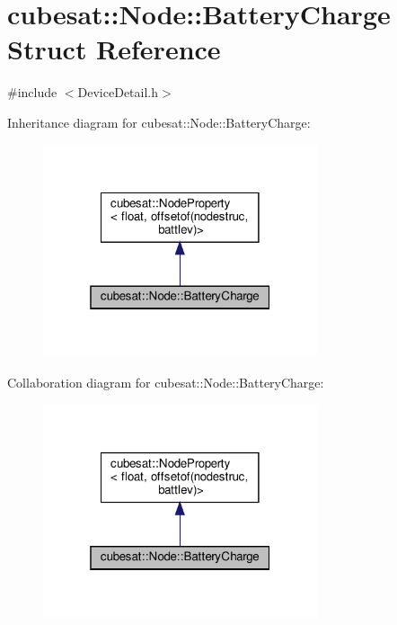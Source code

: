 \hypertarget{structcubesat_1_1Node_1_1BatteryCharge}{}\section{cubesat\+:\+:Node\+:\+:Battery\+Charge Struct Reference}
\label{structcubesat_1_1Node_1_1BatteryCharge}


{\ttfamily \#include $<$Device\+Detail.\+h$>$}



Inheritance diagram for cubesat\+:\+:Node\+:\+:Battery\+Charge\+:
\nopagebreak
\begin{figure}[H]
\begin{center}
\leavevmode
\includegraphics[width=229pt]{structcubesat_1_1Node_1_1BatteryCharge__inherit__graph}
\end{center}
\end{figure}


Collaboration diagram for cubesat\+:\+:Node\+:\+:Battery\+Charge\+:
\nopagebreak
\begin{figure}[H]
\begin{center}
\leavevmode
\includegraphics[width=229pt]{structcubesat_1_1Node_1_1BatteryCharge__coll__graph}
\end{center}
\end{figure}
